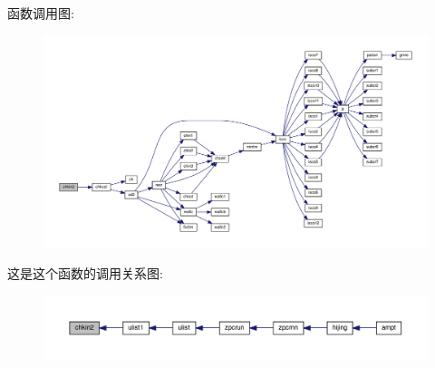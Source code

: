 函数调用图\+:
\nopagebreak
\begin{figure}[H]
\begin{center}
\leavevmode
\includegraphics[width=350pt]{chkin2_8f90_a6ccef5f9cf1733d94f1a696668422086_cgraph}
\end{center}
\end{figure}
这是这个函数的调用关系图\+:
\nopagebreak
\begin{figure}[H]
\begin{center}
\leavevmode
\includegraphics[width=350pt]{chkin2_8f90_a6ccef5f9cf1733d94f1a696668422086_icgraph}
\end{center}
\end{figure}
